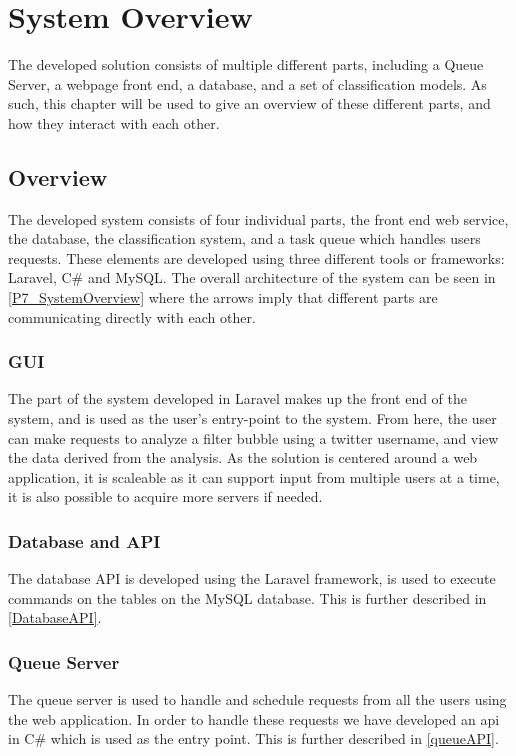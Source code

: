 \chapter{System Overview}\label{ch:sysview}  The developed solution
consists of multiple different parts, including a Queue Server, a webpage front
end, a database, and a set of classification models. As such, this chapter
will be used to give an overview of these different parts, and how they
interact with each other.

\section{Overview}
The developed system consists of four individual parts, the front end web
service, the database, the classification system, and a task queue which handles
users requests. These elements are developed using three different tools or
frameworks: Laravel, C\# and MySQL. The overall architecture of the
system can be seen in \autoref{P7_SystemOverview} where the arrows imply that
different parts are communicating directly with each other.
 

\subsection{GUI} %
The part of the system developed in Laravel makes up the front end of the
system, and is used as the user's entry-point to the system. From here, the
user can make requests to analyze a filter bubble using a twitter username, and
view the data derived from the analysis. As the solution is centered around a web
application, it is scaleable as it can support input from multiple users
at a time, it is also possible to acquire more servers if needed. 

\subsection{Database and API}
The database API is developed using the Laravel framework, is used to execute
commands on the tables on the MySQL database. This is further described in
\autoref{DatabaseAPI}.

\subsection{Queue Server}
The queue server is used to handle and schedule requests from all the users
using the web application. In order to handle these requests we have developed
an api in C\# which is used as the entry point. This is further described in
\autoref{queueAPI}. 

